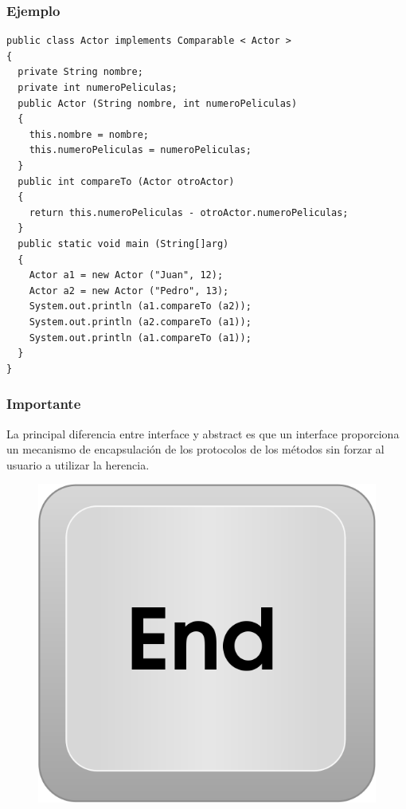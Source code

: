 \documentclass{beamer}
\begin{document}
\begin{frame}[fragile]
\frametitle{Ejemplo}
\begin{footnotesize}
\begin{verbatim}
public class Actor implements Comparable < Actor >
{
  private String nombre;
  private int numeroPeliculas;
  public Actor (String nombre, int numeroPeliculas)
  {
    this.nombre = nombre;
    this.numeroPeliculas = numeroPeliculas;
  }
  public int compareTo (Actor otroActor)
  {
    return this.numeroPeliculas - otroActor.numeroPeliculas;
  }
  public static void main (String[]arg)
  {
    Actor a1 = new Actor ("Juan", 12);
    Actor a2 = new Actor ("Pedro", 13);
    System.out.println (a1.compareTo (a2));
    System.out.println (a2.compareTo (a1));
    System.out.println (a1.compareTo (a1));
  }
}
\end{verbatim}
\end{footnotesize}
\end{frame}


\begin{frame}
\frametitle{Importante}
{\LARGE La principal diferencia entre interface y abstract es que un interface proporciona un mecanismo de encapsulación de los protocolos de los métodos sin forzar al usuario a utilizar la herencia.}
\end{frame}

\begin{frame}
\begin{figure}
\includegraphics[scale=0.4]{imagenes/end.png}
\end{figure}
\end{frame}
\end{document}

